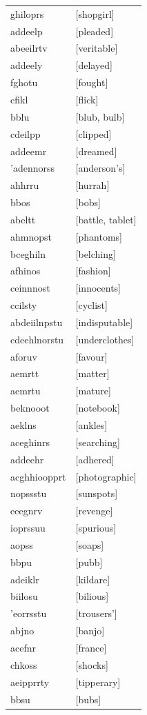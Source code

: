 \documentclass{article}
\begin{document}
\begin{tabular}{ll}
ghiloprs & [shopgirl] \\
addeelp & [pleaded] \\
abeeilrtv & [veritable] \\
addeely & [delayed] \\
fghotu & [fought] \\
cfikl & [flick] \\
bblu & [blub, bulb] \\
cdeilpp & [clipped] \\
addeemr & [dreamed] \\
'adennorss & [anderson's] \\
ahhrru & [hurrah] \\
bbos & [bobs] \\
abeltt & [battle, tablet] \\
ahmnopst & [phantoms] \\
bceghiln & [belching] \\
afhinos & [fashion] \\
ceinnnost & [innocents] \\
ccilsty & [cyclist] \\
abdeiilnpstu & [indisputable] \\
cdeehlnorstu & [underclothes] \\
aforuv & [favour] \\
aemrtt & [matter] \\
aemrtu & [mature] \\
beknooot & [notebook] \\
aeklns & [ankles] \\
aceghinrs & [searching] \\
addeehr & [adhered] \\
acghhioopprt & [photographic] \\
nopssstu & [sunspots] \\
eeegnrv & [revenge] \\
ioprssuu & [spurious] \\
aopss & [soaps] \\
bbpu & [pubb] \\
adeiklr & [kildare] \\
biilosu & [bilious] \\
'eorrsstu & [trousers'] \\
abjno & [banjo] \\
acefnr & [france] \\
chkoss & [shocks] \\
aeipprrty & [tipperary] \\
bbsu & [bubs] \\

\end{tabular}
\end{document}
